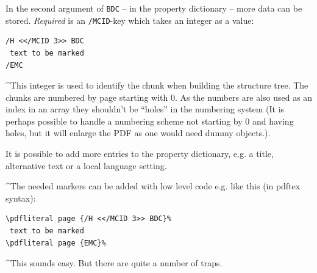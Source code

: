 \documentclass[DIV=12,parskip=half-,bibliography=totoc]{scrartcl}
\newcommand\PDF{PDF}
\begin{document}
\begin{description}
\TagP In the second argument of \texttt{BDC} -- in the property dictionary -- more data can be stored. \emph{Required} is an \texttt{/MCID}-key which takes an integer as a value:\TagPend

\begin{lstlisting}
/H <</MCID 3>> BDC
 text to be marked
/EMC
\end{lstlisting}
\tagmcend\tagstructend

\TagP^This integer is used to identify the chunk when building the structure tree. The chunks are numbered by page starting with 0. As the numbers are also used as an index in an array they shouldn't be \enquote{holes} in the numbering system
(It is perhaps possible to handle a numbering scheme not starting by 0 and having holes, but it will enlarge the \PDF{} as one would need dummy objects.).

\TagP It is possible to add more entries to the property dictionary, e.g. a title, alternative text or a local language setting.\Pmeti
\end{description}


\TagP^The needed markers can be added with low level code e.g. like this (in pdftex syntax):\TagPend

\begin{lstlisting}
\pdfliteral page {/H <</MCID 3>> BDC}%
 text to be marked
\pdfliteral page {EMC}%
\end{lstlisting}
\tagmcend\tagstructend

\TagP^This sounds easy. But there are quite a number of traps.\TagPend
\end{document}
